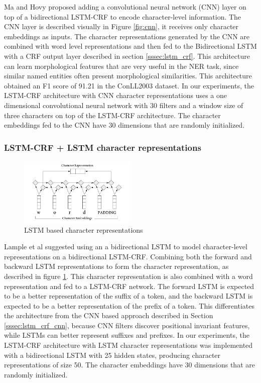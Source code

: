\documentclass{nle}
\begin{document}
Ma and Hovy \cite{Ma2016} proposed adding a convolutional neural network (CNN) layer 
on top of a bidirectional LSTM-CRF to encode character-level information. The CNN
layer is described visually in Figure \ref{fig:cnn}, it receives
only character embeddings as inputs. The character representations generated by the CNN 
are combined with word level representations and then fed to the Bidirectional LSTM with
a CRF output layer described in section \ref{sssec:lstm_crf}.
This architecture can learn morphological features that are very
useful in the NER task, since similar named entities often present morphological similarities. 
This architecture obtained an F1 score of 91.21 in the ConLL2003 dataset. In our experiments, 
the LSTM-CRF architecture with CNN character representations uses a one dimensional convolutional 
neural network with 30 filters and a window size of three characters on top of the LSTM-CRF architecture.
The character embeddings fed to the CNN have 30 dimensions that are randomly initialized.

\subsubsection{LSTM-CRF + LSTM character representations}

\begin{figure}
  \centering
  \includegraphics[width=0.5\textwidth]{pics/lstm_char_representations}
  \caption{LSTM based character representations}
  \label{fig:lstm_char}
\end{figure}

Lample et al \cite{Lample2016} suggested using an a bidirectional LSTM to model character-level 
representations on a bidirectional LSTM-CRF. Combining both the forward and backward 
LSTM representations to form the character representation, as described in figure \ref{fig:lstm_char}. 
This character representation is also combined with a word representation and fed to a LSTM-CRF network. 
The forward LSTM is expected to be a better
representation of the suffix of a token, and the backward LSTM is expected to be a
better representation of the prefix of a token. This differentiates the architecture
from the CNN based approach described in Section \ref{sssec:lstm_crf_cnn}, because CNN filters 
discover positional invariant features, while LSTMs can better represent suffixes and prefixes. In our experiments, 
the LSTM-CRF architecture with LSTM character representations was implemented with a bidirectional LSTM
with 25 hidden states, producing character representations of size 50. The character embeddings
have 30 dimensions that are randomly initialized.
\end{document}
